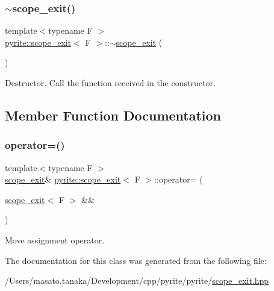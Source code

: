 \subsubsection{\texorpdfstring{$\sim$scope\+\_\+exit()}{~scope\_exit()}}
{\footnotesize\ttfamily template$<$typename F $>$ \\
\mbox{\hyperlink{classpyrite_1_1scope__exit}{pyrite\+::scope\+\_\+exit}}$<$ F $>$\+::$\sim$\mbox{\hyperlink{classpyrite_1_1scope__exit}{scope\+\_\+exit}} (\begin{DoxyParamCaption}{ }\end{DoxyParamCaption})\hspace{0.3cm}{\ttfamily [inline]}}

Destructor. Call the function received in the constructor. 

\subsection{Member Function Documentation}
\mbox{\label{classpyrite_1_1scope__exit_a1b2d819eb3eba7a77102a1df5f5a2668}} 
\subsubsection{\texorpdfstring{operator=()}{operator=()}}
{\footnotesize\ttfamily template$<$typename F $>$ \\
\mbox{\hyperlink{classpyrite_1_1scope__exit}{scope\+\_\+exit}}\& \mbox{\hyperlink{classpyrite_1_1scope__exit}{pyrite\+::scope\+\_\+exit}}$<$ F $>$\+::operator= (\begin{DoxyParamCaption}\item[{\mbox{\hyperlink{classpyrite_1_1scope__exit}{scope\+\_\+exit}}$<$ F $>$ \&\&}]{ }\end{DoxyParamCaption})\hspace{0.3cm}{\ttfamily [default]}}

Move assignment operator. 

The documentation for this class was generated from the following file\+:\begin{DoxyCompactItemize}
\item 
/\+Users/masato.\+tanaka/\+Development/cpp/pyrite/pyrite/\mbox{\hyperlink{scope__exit_8hpp}{scope\+\_\+exit.\+hpp}}\end{DoxyCompactItemize}
